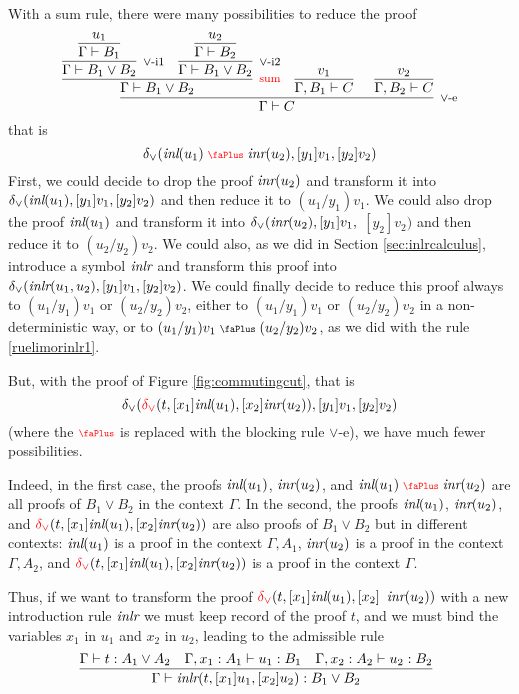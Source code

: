\documentclass[screen, sigconf,authorversion,nonacm]{acmart}
\theoremstyle{acmdefinition}
\numberwithin{equation}{section}
\newcommand\irule[3]{\infer[\mbox{\footnotesize $#3$}]{#2}{#1}}
\newcommand\abstr[1]{[#1]}
\newcommand\inl{\mbox{\it inl}}
\newcommand\inr{\mbox{\it inr}}
\newcommand\inlr{\mbox{\it inlr}}
\newcommand\elimor{\delta_{\vee}}
\newcommand\elimorint{{\color{red} \delta_{\vee}}}
\newcommand\plus{\mathrel{\text{\normalfont\scalebox{0.7}{\faPlus}}}}
\newcommand\plusr{\mathrel{\text{\normalfont\scalebox{0.7}{\color{red}\faPlus}}}}
\begin{document}
With a sum rule, there were many possibilities to reduce the proof
$$\irule{\irule{\irule{\irule{u_1}{\Gamma \vdash B_1}{}}
                      {\Gamma \vdash B_1 \vee B_2}
                      {\mbox{$\vee$-i1}}
              & \irule{\irule{u_2}{\Gamma \vdash B_2}{}}
                      {\Gamma \vdash B_1 \vee B_2}
                      {\mbox{$\vee$-i2}}
               }
               {\Gamma \vdash B_1 \vee B_2}
               {\mbox{\color{red} sum}}
               & \irule{v_1}{\Gamma, B_1 \vdash C}{}
               & \irule{v_2}{\Gamma, B_2 \vdash C}{}
        }
        {\Gamma \vdash C}
        {\mbox{$\vee$-e}}$$
that is
$$\elimor(\inl(u_1) \plusr \inr(u_2) ,\abstr{y_1} v_1, \abstr{y_2} v_2)$$
First, we could decide to drop the proof $\inr(u_2)$ and transform it
into \linebreak $\elimor(\inl(u_1),\abstr{y_1} v_1, \abstr{y_2} v_2)$
and then reduce it to $(u_1/y_1)v_1$. We could also drop the proof
$\inl(u_1)$ and transform it into $\elimor(\inr(u_2),\abstr{y_1} v_1,$
$\abstr{y_2} v_2)$ and then reduce it to $(u_2/y_2)v_2$. We could
also, as we did in Section \ref{sec:inlrcalculus}, introduce a symbol
$\inlr$ and transform this proof into $\elimor(\inlr(u_1,u_2),\abstr{y_1} v_1,
\abstr{y_2} v_2)$.  We could finally decide to reduce this proof
always to $(u_1/y_1)v_1$ or $(u_2/y_2)v_2$, either to $(u_1/y_1)v_1$
or $(u_2/y_2)v_2$ in a non-deterministic way, or to $(u_1/y_1)v_1
\plus (u_2/y_2)v_2$, as we did with the rule \eqref{ruelimorinlr1}.

But, with the proof of Figure \ref{fig:commutingcut}, that is
$$\elimor(\elimorint(t,\abstr{x_1} \inl(u_1), \abstr{x_2} \inr(u_2)),
\abstr{y_1} v_1, \abstr{y_2} v_2)$$
(where the $\plusr$ is replaced with the blocking rule
{\color{red} $\vee$-e}),
we have much fewer possibilities.

Indeed, in the first case, the proofs $\inl(u_1)$, $\inr(u_2)$, and
$\inl(u_1) \plusr \inr(u_2)$ are all proofs of $B_1 \vee B_2$ in the
context $\Gamma$.  In the second, the proofs $\inl(u_1)$, $\inr(u_2)$,
and $\elimorint(t,\abstr{x_1} \inl(u_1), \abstr{x_2} \inr(u_2))$ are
also proofs of $B_1 \vee B_2$ but in different contexts: $\inl(u_1)$
is a proof in the context $\Gamma, A_1$, $\inr(u_2)$ is a proof in the
context $\Gamma, A_2$, and $\elimorint(t,\abstr{x_1} \inl(u_1),
\abstr{x_2} \inr(u_2))$ is a proof in the context $\Gamma$.

Thus, if we want to transform the proof $\elimorint(t,\abstr{x_1}
\inl(u_1),\abstr{x_2}$ $\inr(u_2))$ with a new introduction rule
$\inlr$ we must keep record of the proof $t$, and we must bind the
variables $x_1$ in $u_1$ and $x_2$ in $u_2$, leading to the admissible
rule
$$\irule{\Gamma \vdash t:A_1 \vee A_2 & \Gamma, x_1:A_1 \vdash u_1:B_1 &
         \Gamma, x_2:A_2 \vdash u_2:B_2}
        {\Gamma \vdash \inlr(t,\abstr{x_1} u_1,\abstr{x_2} u_2):B_1 \vee B_2}
        {}$$
\end{document}
